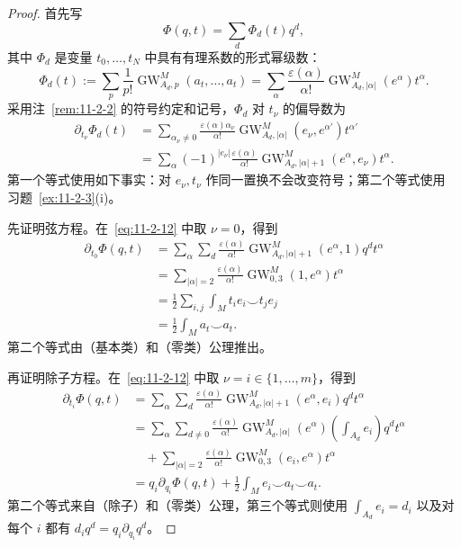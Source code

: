 \begin{proof}
首先写
\[
  \Phi(q,t)=\sum_d\Phi_d(t)q^d,
\]
其中 $\Phi_d$ 是变量 $t_0,\ldots,t_N$ 中具有有理系数的形式幂级数：
\[
  \Phi_d(t):=\sum_p\frac1{p!}
  \operatorname{GW}_{A_d,p}^M(a_t,\ldots,a_t)
  =\sum_\alpha\frac{\varepsilon(\alpha)}{\alpha!}
  \operatorname{GW}_{A_d,|\alpha|}^M(e^\alpha)t^\alpha.
\]
采用注~\ref{rem:11-2-2} 的符号约定和记号，$\Phi_d$ 对 $t_\nu$ 的偏导数为
\begin{equation}\label{eq:11-2-12}
\begin{aligned}
  \partial_{t_\nu}\Phi_d(t)
  &=
  \sum_{\alpha_\nu\ne0}
  \frac{\varepsilon(\alpha)\alpha_\nu}{\alpha!}
  \operatorname{GW}_{A_d,|\alpha|}^M(e_\nu,e^{\alpha'})t^{\alpha'}\\
  &=
  \sum_\alpha(-1)^{|e_\nu|}
  \frac{\varepsilon(\alpha)}{\alpha!}
  \operatorname{GW}_{A_d,|\alpha|+1}^M(e^\alpha,e_\nu)t^\alpha.
\end{aligned}
\end{equation}
第一个等式使用如下事实：对 $e_\nu,t_\nu$ 作同一置换不会改变符号；第二个等式使用
习题~\ref{ex:11-2-3}(i)。

先证明弦方程。在~\eqref{eq:11-2-12} 中取 $\nu=0$，得到
\[
\begin{aligned}
  \partial_{t_0}\Phi(q,t)
  &=
  \sum_\alpha\sum_d\frac{\varepsilon(\alpha)}{\alpha!}
  \operatorname{GW}_{A_d,|\alpha|+1}^M(e^\alpha,1)q^dt^\alpha\\
  &=
  \sum_{|\alpha|=2}\frac{\varepsilon(\alpha)}{\alpha!}
  \operatorname{GW}_{0,3}^M(1,e^\alpha)t^\alpha\\
  &=
  \frac12\sum_{i,j}\int_Mt_ie_i\smile t_je_j\\
  &=
  \frac12\int_Ma_t\smile a_t.
\end{aligned}
\]
第二个等式由（基本类）和（零类）公理推出。

再证明除子方程。在~\eqref{eq:11-2-12} 中取 $\nu=i\in\{1,\ldots,m\}$，得到
\[
\begin{aligned}
  \partial_{t_i}\Phi(q,t)
  &=
  \sum_\alpha\sum_d\frac{\varepsilon(\alpha)}{\alpha!}
  \operatorname{GW}_{A_d,|\alpha|+1}^M(e^\alpha,e_i)q^dt^\alpha\\
  &=
  \sum_\alpha\sum_{d\ne0}\frac{\varepsilon(\alpha)}{\alpha!}
  \operatorname{GW}_{A_d,|\alpha|}^M(e^\alpha)
  \left(\int_{A_d}e_i\right)q^dt^\alpha\\
  &\quad+
  \sum_{|\alpha|=2}\frac{\varepsilon(\alpha)}{\alpha!}
  \operatorname{GW}_{0,3}^M(e_i,e^\alpha)t^\alpha\\
  &=
  q_i\partial_{q_i}\Phi(q,t)
  +\frac12\int_Me_i\smile a_t\smile a_t.
\end{aligned}
\]
第二个等式来自（除子）和（零类）公理，第三个等式则使用
$\int_{A_d}e_i=d_i$ 以及对每个 $i$ 都有 $d_iq^d=q_i\partial_{q_i}q^d$。


\end{proof}
